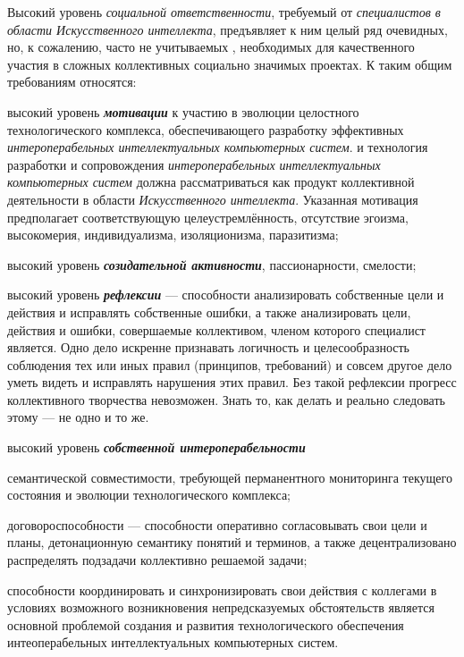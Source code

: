 Высокий уровень \textit{социальной ответственности}, требуемый от \textit{специалистов в области Искусственного интеллекта}, предъявляет к ним целый ряд очевидных, но, к сожалению, часто не учитываемых , необходимых для качественного участия в сложных коллективных социально значимых проектах. К таким общим требованиям относятся:

\begin{textitemize}
	\item  высокий уровень \textbf{\textit{мотивации}} к участию в  эволюции целостного технологического комплекса, обеспечивающего разработку эффективных \textit{интероперабельных интеллектуальных компьютерных систем}.  и  технология разработки и сопровождения \textit{интероперабельных интеллектуальных компьютерных систем} должна рассматриваться как  продукт коллективной деятельности в области \textit{Искусственного интеллекта}. Указанная мотивация предполагает соответствующую целеустремлённость, отсутствие эгоизма, высокомерия, индивидуализма, изоляционизма, паразитизма;
	\medskip
	\item высокий уровень \textbf{\textit{созидательной активности}}, пассионарности, смелости;
	\medskip
	\item высокий уровень \textbf{\textit{рефлексии}} --- способности анализировать собственные цели и действия и исправлять собственные ошибки, а также анализировать цели, действия и ошибки, совершаемые коллективом, членом которого специалист является. Одно дело искренне признавать логичность и целесообразность соблюдения тех или иных правил (принципов, требований) и совсем другое дело уметь видеть и исправлять  нарушения этих правил. Без такой рефлексии прогресс коллективного творчества невозможен. Знать то, как  делать и реально следовать этому --- не одно и то же.
	\medskip
	\item высокий уровень \textbf{\textit{собственной интероперабельности}}
	\begin{textitemize}
		\item семантической совместимости, требующей перманентного мониторинга текущего состояния и эволюции технологического комплекса;
		\item договороспособности --- способности оперативно согласовывать свои цели и планы, детонационную семантику понятий и терминов, а также децентрализовано распределять подзадачи коллективно решаемой задачи;
		\item способности координировать и синхронизировать свои действия с коллегами в условиях возможного возникновения непредсказуемых обстоятельств является основной проблемой создания и развития технологического обеспечения интеоперабельных интеллектуальных компьютерных систем.
	\end{textitemize}
	

\end{textitemize}
